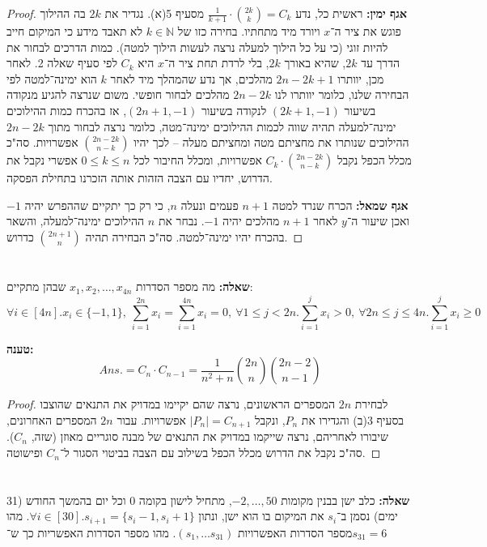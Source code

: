 \documentclass[]{article}
\newcommand\N     {\mathbb{N}}
\newcommand\ans   {\mathit{Ans.}}
\begin{document}
\begin{enumerate}[(A)]
\begin{proof}
			\textbf{אגף ימין: }ראשית כל, נדע $\frac{1}{k + 1} \cdot \binom{2k}{k} = C_k$ מסעיף 5(א). נגדיר את $2k$ בה ההילוך פוגש את ציר ה־$x$ ויורד מיד מתחתיו. בחירה כזו של $k \in \N$ לא תאבד מידע כי המיקום חייב להיות זוגי (כי על כל הילוך למעלה נרצה לעשות הילוך למטה). כמות הדרכים לבחור את הדרך עד $2k$, שהיא באורך $2k$, בלי לרדת תחת ציר ה־$x$ היא $C_k$ לפי סעיף שאלה 2. לאחר מכן, יוותרו $2n - 2k  + 1$ מהלכים, אך נדע שהמהלך מיד לאחר $k$ הוא ימינה־למטה לפי הבחירה שלנו, כלומר יוותרו לנו $2n - 2k$ מהלכים לבחור חופשי. משום שנרצה להגיע מנקודה בשיעור $(2k + 1, -1)$ לנקודה בשיעור $(2n + 1, -1)$, אז בהכרח כמות ההילוכים ימינה־למעלה תהיה שווה לכמות ההילוכים ימינה־מטה, כלומר נרצה לבחור מתוך $2n - 2k$ ההילוכים שנותרו את מחציתם מטה ומחציתם מעלה – לכך יהיו $\binom{2n - 2k}{n - k}$ אפשרויות. סה"כ מכלל הכפל נקבל $C_k \cdot \binom{2n - 2k}{n - k}$ אפשרויות, ומכלל החיבור לכל $0 \le k \le n $ אפשרי נקבל את הדרוש, יחדיו עם הצבה הזהות אותה הזכרנו בתחילת הפסקה. 
			
			\textbf{אגף שמאל: }הכרח שנרד למטה $n + 1$ פעמים ונעלה $n$, כי רק כך יתקיים שההפרש יהיה $-1$ ואכן שיעור ה־$y$ לאחר $n + 1$ מהלכים יהיה $-1$. נבחר את $n$ ההילוכים ימינה־למעלה, והשאר בהכרח יהיו ימינה־למטה. סה"כ הבחירה תהיה $\binom{2n + 1}{n}$ כדרוש. 
		\end{proof}
		
	\end{enumerate}
	
	\section{} %
	\textbf{שאלה: }מה מספר הסדרות $x_1, x_2, \dots, x_{4n}$ שבהן מתקיים: 
	\[ \forall i \in [4n]. x_i \in \{-1, 1\}, \ \sum_{i = 1}^{2n}x_i = \sum_{i = 1}^{4n}x_i = 0, \ \forall 1 \le j < 2n. \sum_{i = 1}^{j} x_i > 0, \ \forall 2n \le j \le 4n. \sum_{i = 1}^{j}x_i \ge 0 \]
	
	\textbf{טענה:}
	\[ \ans = C_n \cdot C_{n - 1} = \frac{1}{n^2 + n}\binom{2n}{n}\binom{2n - 2}{n - 1} \]
	
	\begin{proof}
		לבחירת $2n$ המספרים הראשונים, נרצה שהם יקיימו במדויק את התנאים שהוצבו בסעיף 3(ב) והגדירו את $P_n$, ונקבל $|P_n| = C_{n + 1}$ אפשרויות. עבור $2n$ המספרים האחרונים, שיבורו לאחריהם, נרצה שייקמו במדויק את התנאים של מבנה סוגריים מאוזן (שזה, $C_n$). סה"כ נקבל את הדרוש מכלל הכפל בשילוב עם הצבה בביטוי הסגור ל־$C_n$ ופישוטה. 
	\end{proof}
	
	\section{} %
	\textbf{שאלה: }כלב ישן בבנין מקומות $-2, \dots, 50$, מתחיל לישון בקומה $0$ וכל יום בהמשך החודש (31 ימים) נסמן ב־$s_i$ את המיקום בו הוא ישן, ונתון $\forall i \in [30]. s_{i + 1} = \{s_i - 1, s_i + 1\}$. מהו מספר הסדרות האפשרויות $(s_1, \dots s_{31})$. מהו מספר הסדרות האפשריות כך ש־$s_{31} = 6$
	
\end{document}
